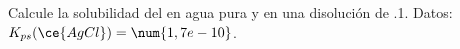 Calcule la solubilidad del  en agua pura y en una disolución de  \SI{,1}{\Molar}. Datos: $K_{ps}(\ce{AgCl})=\num{1,7e-10}$.
